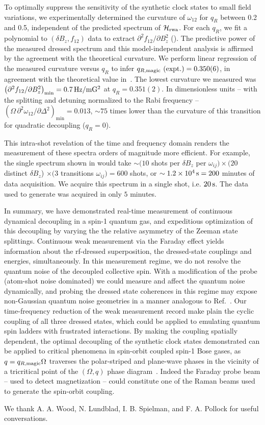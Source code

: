 \documentclass[aps,prl,reprint,superscriptaddress,floatfix]{revtex4-1}
\begin{document}
To optimally suppress the sensitivity of the synthetic clock states to small field variations, we experimentally determined the curvature of $\omega_{12}$  for $q_R$ between 0.2 and 0.5, independent of the predicted spectrum of $\mathcal{H}_{\text{rwa}}$.
For each $q_R$, we fit a polynomial to $(\delta B_z, f_{12})$ data to extract $\partial^2 f_{12}/\partial B_z^2$ ().
The predictive power of the measured dressed spectrum and this model-independent analysis is affirmed by the agreement with the theoretical curvature.
We perform linear regression of the measured curvature versus $q_R$ to infer $q_{R,\text{magic}}\text{ (expt.)} = 0.350(6)$, in agreement with the theoretical value in~.
The lowest curvature we measured was $\left(\partial^2 f_{12}/\partial B_z^2\right)_{\text{min}} = \unit[0.7]{Hz/mG^2}$ at $q_R = 0.351(2)$.
In dimensionless units -- with the splitting and detuning normalized to the Rabi frequency -- $\left(\Omega\, \partial^2\omega_{12}/\partial \Delta^2\right)_{\text{min}} = 0.013$, $\sim 75$ times lower than the curvature of this transition for quadratic decoupling ($q_R = 0$).

This intra-shot revelation of the time and frequency domain renders the measurement of these spectra orders of magnitude more efficient.
For example, the single spectrum shown in  would take $\sim (10$ shots per $\delta B_z$ per $\omega_{ij} ) \times (20$ distinct $\delta B_z$) $\times (3 $ transitions $\omega_{ij}) = 600$ shots, or $\sim \unit[1.2\times10^4]{s} = 200$ minutes of data acquisition.
We acquire this spectrum in a single shot, i.e. $\unit[20]{s}$.
The data used to generate  was acquired in only $5$ minutes.

In summary, we have demonstrated real-time measurement of continuous dynamical decoupling in a spin-1 quantum gas, and expeditious optimization of this decoupling by varying the the relative asymmetry of the Zeeman state splittings.
Continuous weak measurement via the Faraday effect yields information about the rf-dressed superposition, the dressed-state couplings and energies, simultaneously.
In this measurement regime, we do not resolve the quantum noise of the decoupled collective spin.
With a modification of the probe (atom-shot noise dominated) we could measure and affect the quantum noise dynamically,
and probing the dressed state coherences in this regime may expose non-Gaussian quantum noise geometries in a manner analogous to Ref.~\cite{colangelo_simultaneous_2017}.
Our time-frequency reduction of the weak measurement record make plain the cyclic coupling of all three dressed states, which could be applied to emulating quantum spin ladders with frustrated interactions.
By making the coupling spatially dependent, the optimal decoupling of the synthetic clock states demonstrated can be applied to critical phenomena in spin-orbit coupled spin-1 Bose gases, as $q = q_{R,\text{magic}} \Omega$ traverses the polar-striped and plane-wave phases in the vicinity of a tricritical point of the $(\Omega, q)$ phase diagram~\cite{martone_tricriticalities_2016}.
Indeed the Faraday probe beam -- used to detect magnetization -- could constitute one of the Raman beams used to generate the spin-orbit coupling.

We thank A. A. Wood, N. Lundblad, I. B. Spielman, and F. A. Pollock for useful conversations.


\end{document}
